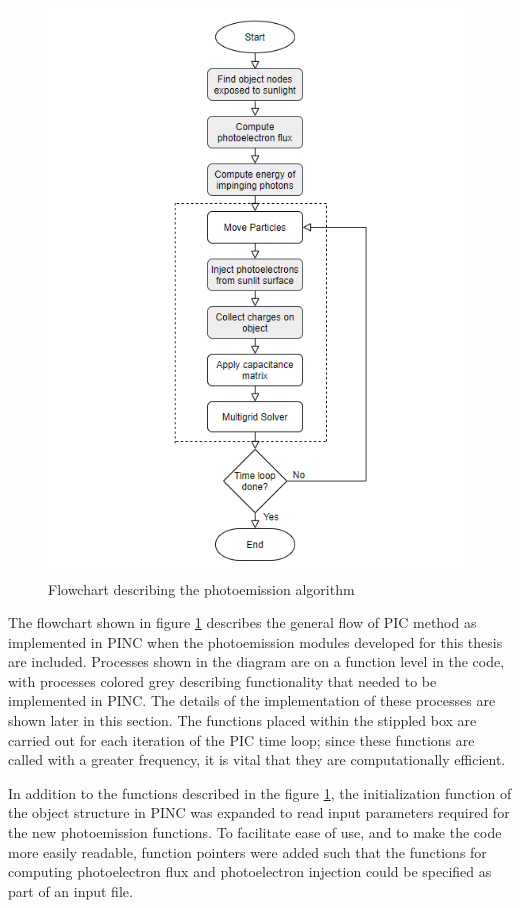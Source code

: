 \begin{figure}[h!]
    \centering
    \includegraphics[width=12
    cm, height=15cm]{figures/photoemission.PNG}
    \caption{Flowchart describing the photoemission algorithm}
    \label{fig:photoemission}
\end{figure}

The flowchart shown in figure \ref{fig:photoemission} describes the general flow of PIC method as implemented in PINC when the photoemission modules developed for this thesis are included. Processes shown in the diagram are on a function level in the code, with processes colored grey describing functionality that needed to be implemented in PINC. The details of the implementation of these processes are shown later in this section. The functions placed within the stippled box are carried out for each iteration of the PIC time loop; since these functions are called with a greater frequency, it is vital that they are computationally efficient.

In addition to the functions described in the figure \ref{fig:photoemission}, the initialization function of the object structure in PINC was expanded to read input parameters required for the new photoemission functions. To facilitate ease of use, and to make the code more easily readable, function pointers were added such that the functions for computing photoelectron flux and photoelectron injection could be specified as part of an input file. 


